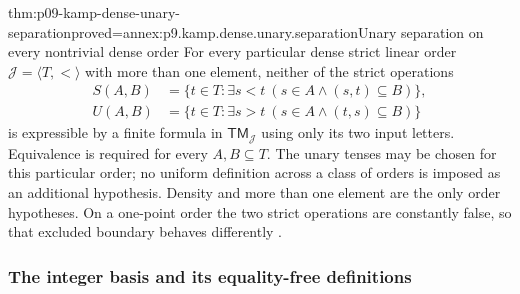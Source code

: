 \begin{hbtheorem}{thm:p09-kamp-dense-unary-separation}{proved=annex:p9.kamp.dense.unary.separation}{Unary separation on every nontrivial dense order}
For every particular dense strict linear order
\(\mathcal J=\langle T,<\rangle\) with more than one element,
neither of the strict operations
\[
\begin{aligned}
 S(A,B)&=\{t\in T:\exists s<t\ (s\in A\land(s,t)\subseteq B)\},\\
 U(A,B)&=\{t\in T:\exists s>t\ (s\in A\land(t,s)\subseteq B)\}
\end{aligned}
\]
is expressible by a finite formula in
\(\mathsf{TM}_{\mathcal J}\) using only its two input letters.
Equivalence is required for every \(A,B\subseteq T\).
The unary tenses may be chosen for this particular order; no uniform
definition across a class of orders is imposed as an additional
hypothesis. Density and more than one element are the only order
hypotheses. On a one-point order the two strict operations are constantly
false, so that excluded boundary behaves differently
\cite[ch.~IV, pp.~99--100]{Kamp1968}.
\end{hbtheorem}

\subsubsection{The integer basis and its equality-free definitions}


